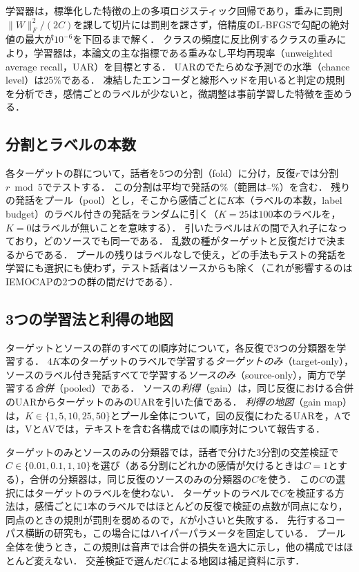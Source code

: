 学習器は，標準化した特徴の上の多項ロジスティック回帰であり，重みに罰則$\|W\|_F^2/(2C)$を課して切片には罰則を課さず，倍精度のL-BFGS\cite{liu1989lbfgs}で勾配の絶対値の最大が$10^{-6}$を下回るまで解く．
クラスの頻度に反比例するクラスの重みにより，学習器は，本論文の主な指標である重みなし平均再現率（unweighted average recall，UAR）を目標とする．
UARのでたらめな予測での水準（chance level）は25\%である．
凍結したエンコーダと線形ヘッドを用いると判定の規則を分析でき，感情ごとのラベルが少ないと，微調整は事前学習した特徴を歪めうる\cite{kumar2022lpft}．

\subsection{分割とラベルの本数}
\label{sec:setting-splits}

各ターゲットの群について，話者を5つの分割（fold）に分け，反復$r$では分割$r \bmod 5$でテストする．
この分割は平均で発話の\%（範囲は--\%）を含む．
残りの発話をプール（pool）とし，そこから感情ごとに$K$本（ラベルの本数，label budget）のラベル付きの発話をランダムに引く（$K=25$は$100$本のラベルを，$K=0$はラベルが無いことを意味する）．
引いたラベルは$K$の間で入れ子になっており，どのソースでも同一である．
乱数の種がターゲットと反復だけで決まるからである．
プールの残りはラベルなしで使え，どの手法もテストの発話を学習にも選択にも使わず，テスト話者はソースからも除く（これが影響するのはIEMOCAPの2つの群の間だけである）．

\subsection{3つの学習法と利得の地図}
\label{sec:setting-map}

ターゲットとソースの群のすべての順序対について，各反復で3つの分類器を学習する．
$4K$本のターゲットのラベルで学習する\emph{ターゲットのみ}（target-only），ソースのラベル付き発話すべてで学習する\emph{ソースのみ}（source-only），両方で学習する\emph{合併}（pooled）である．
ソースの\emph{利得}（gain）は，同じ反復における合併のUARからターゲットのみのUARを引いた値である．
\emph{利得の地図}（gain map）は，$K \in \{1, 5, 10, 25, 50\}$とプール全体について，回の反復にわたるUARを，Aでは，VとAVでは，テキストを含む各構成ではの順序対について報告する．

ターゲットのみとソースのみの分類器では，話者で分けた3分割の交差検証で$C \in \{0.01, 0.1, 1, 10\}$を選び（ある分割にどれかの感情が欠けるときは$C=1$とする），合併の分類器は，同じ反復のソースのみの分類器の$C$を使う．
この$C$の選択にはターゲットのラベルを使わない．
ターゲットのラベルで$C$を検証する方法は，感情ごとに1本のラベルではほとんどの反復で検証の点数が同点になり，同点のときの規則が罰則を弱めるので，$K$が小さいと失敗する．
先行するコーパス横断の研究も，この場合にはハイパーパラメータを固定している\cite{gideon2021addog}．
プール全体を使うとき，この規則は音声では合併の損失を過大に示し，他の構成ではほとんど変えない．
交差検証で選んだ$C$による地図は補足資料に示す．

